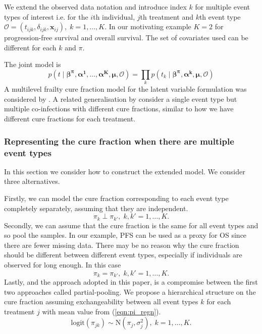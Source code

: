 \documentclass[AMA,STIX1COL]{WileyNJD-v2}
\begin{document}
We extend the observed data notation and introduce index $k$ for multiple event types of interest
i.e. for the $i$th individual, $j$th treatment and $k$th event type 
$\mathcal{O} = (t_{ijk}, \delta_{ijk}, \boldsymbol{x}_{ij}), \; k = 1, \ldots, K$.
In our motivating example $K = 2$ for progression-free survival and overall survival.
The set of covariates used can be different for each $k$ and $\pi$.

The joint model is
$$
p(t \mid \boldsymbol{\beta^{\pi}}, \boldsymbol{\alpha^1}, \ldots, \boldsymbol{\alpha^K}, \boldsymbol{\mu}, \mathcal{O}) =
\prod_k p(t_k \mid \boldsymbol{\beta^{\pi}}, \boldsymbol{\alpha^{k}}, \boldsymbol{\mu}, \mathcal{O})
$$
A multilevel frailty cure fraction model for the latent variable formulation was considered by \cite{Tawiah2020}.
A related generalisation by \cite{Balogun2020} consider a single event type but multiple co-infections with different cure fractions,
similar to how we have different cure fractions for each treatment.

%
\subsubsection{Representing the cure fraction when there are multiple event types}
In this section we consider how to construct the extended model.
We consider three alternatives.

Firstly, we can model the cure fraction corresponding to each event type completely separately, assuming that they are independent.
$$
\pi_k \perp \pi_{k'}, \; k,k' = 1, \ldots, K.
$$
Secondly, we can assume that the cure fraction is the same for all event types and so pool the samples.
In our example, PFS can be used as a proxy for OS since there are fewer missing data.
There may be no reason why the cure fraction should be different between different event types, especially if individuals are observed for long enough.
In this case
$$
\pi_k = \pi_{k'}, \; k,k' = 1, \ldots, K.
$$
Lastly, and the approach adopted in this paper, is a compromise between the first two approaches called partial-pooling.
We propose a hierarchical structure on the cure fraction assuming exchangeability between all event types $k$ for each treatment $j$ with mean value from (\ref{eqn:pi_regn}).
$$
\text{logit}(\pi_{jk}) \sim \text{N}(\pi_j, \sigma_j^2), \; k = 1, \ldots, K.  
$$
\end{document}
